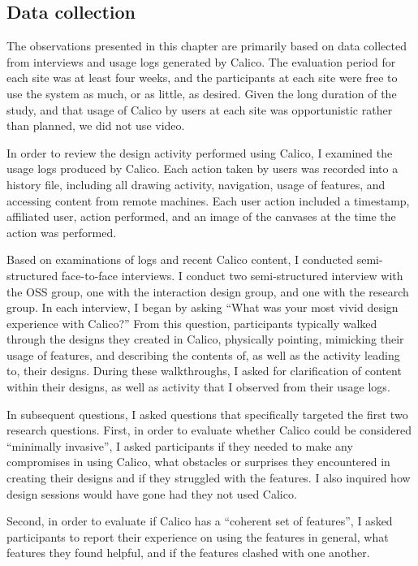 \subsection{Data collection}

The observations presented in this chapter are primarily based on data collected from interviews and usage logs generated by Calico. The evaluation period for each site was at least four weeks, and the participants at each site were free to use the system as much, or as little, as desired. Given the long duration of the study, and that usage of Calico by users at each site was opportunistic rather than planned, we did not use video.

In order to review the design activity performed using Calico, I examined the usage logs produced by Calico. Each action taken by users was recorded into a history file, including all drawing activity, navigation, usage of features, and accessing content from remote machines. Each user action included a timestamp, affiliated user, action performed, and an image of the canvases at the time the action was performed. 

Based on examinations of logs and recent Calico content, I conducted semi-structured face-to-face interviews. I conduct two semi-structured interview with the OSS group, one with the interaction design group, and one with the research group. In each interview, I began by asking ``What was your most vivid design experience with Calico?'' From this question, participants typically walked through the designs they created in Calico, physically pointing, mimicking their usage of features, and describing the contents of, as well as the activity leading to, their designs. During these walkthroughs, I asked for clarification of content within their designs, as well as activity that I observed from their usage logs.

In subsequent questions, I asked questions that specifically targeted the first two research questions. First, in order to evaluate whether Calico could be considered ``minimally invasive'', I asked participants if they needed to make any compromises in using Calico, what obstacles or surprises they encountered in creating their designs and if they struggled with the features. I also inquired how design sessions would have gone had they not used Calico. 

Second, in order to evaluate if Calico has a ``coherent set of features'', I asked participants to report their experience on using the features in general, what features they found helpful, and if the features clashed with one another. 

